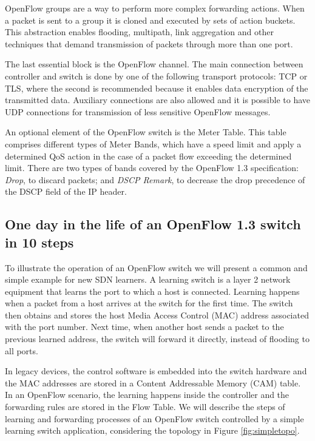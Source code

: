 OpenFlow groups are a way to perform more complex forwarding actions. When a packet is sent to a group it is cloned and executed by sets of action buckets. This abstraction enables flooding, multipath, link aggregation and other techniques that demand transmission of packets through more than one port. 

The last essential block is the OpenFlow channel. The main connection between controller and switch is done by one of the following transport protocols: TCP or TLS, where the second is recommended because it enables data encryption of the transmitted data. Auxiliary connections are also allowed and it is possible to have UDP connections for transmission of less sensitive OpenFlow messages.

An optional element of the OpenFlow switch is the Meter Table. This table comprises different types of Meter Bands, which have a speed limit and apply a determined QoS action in the case of a packet flow exceeding the determined limit. There are two types of bands covered by the OpenFlow 1.3 specification: \textit{Drop}, to discard packets; and \textit{DSCP Remark}, to decrease the drop precedence of the DSCP field of the IP header.

\subsection{One day in the life of an OpenFlow 1.3 switch in 10 steps}

To illustrate the operation of an OpenFlow switch we will present a common and simple example for new SDN learners. A learning switch is a layer 2 network equipment that learns the port to which a host is connected. Learning happens when a packet from a host arrives at the switch for the first time. The switch then obtains and stores the host Media Access Control (MAC) address associated with the port number. Next time, when another host sends a packet to the previous learned address, the switch will forward it directly, instead of flooding to all ports. 

In legacy devices, the control software is embedded into the switch hardware and the MAC addresses are stored in a Content Addressable Memory (CAM) table. In an OpenFlow scenario, the learning happens inside the controller and the forwarding rules are stored in the Flow Table. We will describe the steps of learning and forwarding processes of an OpenFlow switch controlled by a simple learning switch application, considering the topology in Figure \ref{fig:simpletopo}. 

